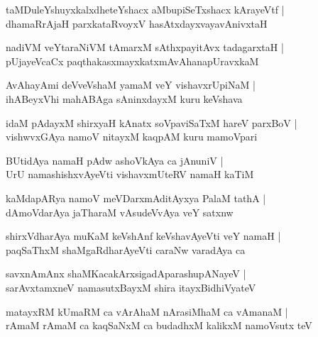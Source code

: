 \documentclass[twoside,12pt,openright]{book}
\newcounter{shloka}[chapter]
\begin{document}
\begin{shloka}%
taMDuleYshuyxkalxdheteYshacx aMbupiSeTxshacx kArayeVtf |\\
dhamaRrAjaH parxkataRvoyxV hasAtxdayxvayavAnivxtaH 
\end{shloka}

\begin{shloka}%
nadiVM veYtaraNiVM tAmarxM sAthxpayitAvx tadagarxtaH |\\
pUjayeVcaCx paqthakasxmayxkatxmAvAhanapUravxkaM
\end{shloka}

\begin{shloka}%
AvAhayAmi deVveVshaM yamaM veY vishavxrUpiNaM |\\
ihABeyxVhi mahABAga sAninxdayxM kuru keVshava
\end{shloka}

\begin{shloka}%
idaM pAdayxM shirxyaH kAnatx soVpaviSaTxM hareV parxBoV |\\
vishwvxGAya namoV nitayxM kaqpAM kuru mamoVpari 
\end{shloka}

\begin{shloka}%
BUtidAya namaH pAdw ashoVkAya ca jAnuniV |\\
UrU namashishxvAyeVti vishavxmUteRV namaH kaTiM 
\end{shloka}

\begin{shloka}%
kaMdapARya namoV meVDarxmAditAyxya PalaM tathA |\\
dAmoVdarAya jaTharaM vAsudeVvAya veY satxnw
\end{shloka}

\begin{shloka}%
shirxVdharAya muKaM keVshAnf keVshavAyeVti veY namaH |\\
paqSaThxM shaMgaRdharAyeVti caraNw varadAya ca 
\end{shloka}

\begin{shloka}%
savxnAmAnx shaMKacakArxsigadAparashupANayeV |\\
sarAvxtamxneV namasutxBayxM shira itayxBidhiVyateV 
\end{shloka}

\begin{shloka}%
matayxRM kUmaRM ca vArAhaM nArasiMhaM ca vAmanaM |\\
rAmaM rAmaM ca kaqSaNxM ca budadhxM kalikxM namoVsutx teV
\end{shloka}
\end{document}
